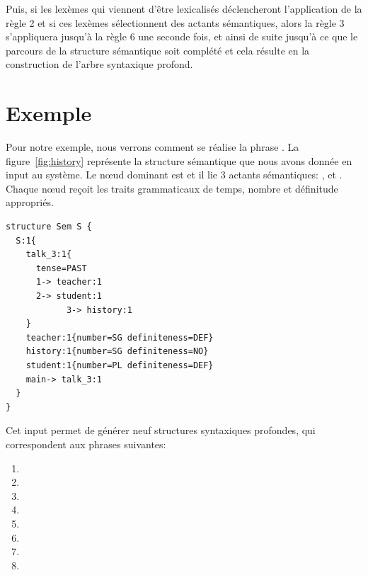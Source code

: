 \begin{enumerate}
Puis, si les lexèmes qui viennent d'être lexicalisés déclencheront l'application de la règle 2 et si ces lexèmes sélectionnent des actants sémantiques, alors la règle 3 s'appliquera jusqu'à la règle 6 une seconde fois, et ainsi de suite jusqu'à ce que le parcours de la structure sémantique soit complété et cela résulte en la construction de l'arbre syntaxique profond.

\end{enumerate} 

\section{Exemple}

Pour notre exemple, nous verrons comment se réalise la phrase . La figure~\ref{fig:history} représente la structure sémantique que nous avons donnée en input au système. Le n\oe{}ud dominant est  et il lie 3 actants sémantiques: ,  et . Chaque n\oe{}ud reçoit les traits grammaticaux de temps, nombre et définitude appropriés.

\begin{lstlisting}[language=mate, caption=Structure sémantique de \form{The teacher talked about history to the students}, label=fig:history]
structure Sem S {
  S:1{
    talk_3:1{
      tense=PAST 
      1-> teacher:1
      2-> student:1
			3-> history:1
    }
    teacher:1{number=SG definiteness=DEF}
    history:1{number=SG definiteness=NO}
    student:1{number=PL definiteness=DEF}
    main-> talk_3:1
  }
}
\end{lstlisting}

Cet input permet de générer neuf structures syntaxiques profondes, qui correspondent aux phrases suivantes:

\begin{enumerate}
  \item {}
  \item {}
  \item {}
  \item {}
  \item {}
  \item {}
  \item {}
  \item {}
\end{enumerate}

